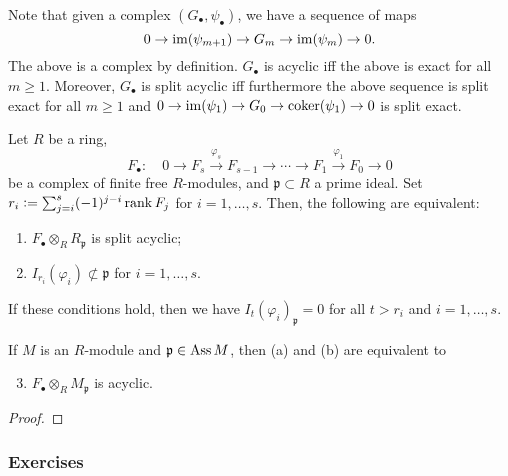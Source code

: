 \documentclass[12pt]{article}
\begin{document}
Note that given a complex $(G_{\bullet}, \psi_{\bullet})$, we have a sequence of maps
\begin{equation*} 
	0 \to \operatorname{im}(\psi_{m + 1}) \to G_{m} \to \operatorname{im}(\psi_{m}) \to 0.
\end{equation*}
The above is a complex by definition. $G_{\bullet}$ is acyclic iff the above is exact for all $m \ge 1$. Moreover, $G_{\bullet}$ is split acyclic iff furthermore the above sequence is split exact for all $m \ge 1$ and $0 \to \operatorname{im}(\psi_{1}) \to G_{0} \to \operatorname{coker}(\psi_{1}) \to 0$ is split exact. 

\begin{prop}
	Let $R$ be a ring, 
	\begin{equation*} 
		F_{\bullet}: \quad 0 \to F_{s} \xrightarrow{\varphi_{s}} F_{s - 1} \to \cdots \to F_{1} \xrightarrow{\varphi_{1}} F_{0} \to 0
	\end{equation*}
	be a complex of finite free $R$-modules, and $\mathfrak{p} \subset R$ a prime ideal. Set $r_{i} \vcentcolon= \sum_{j = i}^{s} (-1)^{j - i} \operatorname{rank} F_{j}$ for $i = 1, \ldots, s$. Then, the following are equivalent:
	\begin{enumerate}[label=(\alph*)]
		\item $F_{\bullet} \otimes_{R} R_{\mathfrak{p}}$ is split acyclic;
		\item $I_{r_{i}}(\varphi_{i}) \not\subset \mathfrak{p}$ for $i = 1, \ldots, s$.
	\end{enumerate}
	If these conditions hold, then we have $I_{t}(\varphi_{i})_{\mathfrak{p}} = 0$ for all $t > r_{i}$ and $i = 1, \ldots, s$. 

	If $M$ is an $R$-module and $\mathfrak{p} \in \operatorname{Ass} M$, then (a) and (b) are equivalent to
	\begin{enumerate}[label=(\alph*)]
		\setcounter{enumi}{2}
		\item $F_{\bullet} \otimes_{R} M_{\mathfrak{p}}$ is acyclic.
	\end{enumerate}
\end{prop}
\begin{proof} 
	
\end{proof}

\subsubsection{Exercises}
\end{document}
